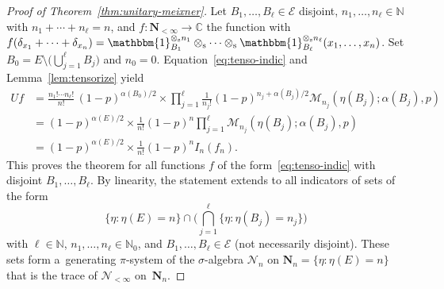 \documentclass[10pt,a4paper]{amsart}
\numberwithin{equation}{section}
\newcommand{\N}{\mathbb{N}}
\newcommand{\C}{\mathbb{C}}
\newcommand{\1}{\mathbbm{1}}
\begin{document}
\begin{proof}[Proof of Theorem~\ref{thm:unitary-meixner}]
	Let $B_1,\ldots, B_\ell \in \mathcal E$ disjoint, $n_1,\ldots,n_\ell \in \N$ with $n_1+\cdots + n_\ell=n$, and $f\colon \mathbf N_{<\infty}\to \C$ the function with $f(\delta_{x_1}+\cdots + \delta_{x_n}) = \1_{B_1}^{\otimes_\mathrm s n_1}\otimes_{\mathrm s} \cdots \otimes_{\mathrm s} \1_{B_\ell}^{\otimes_\mathrm s n_\ell}(x_1,\ldots,x_n)$. Set $B_0 = E\setminus \bigl(\bigcup_{j=1}^\ell B_j\bigr)$ and $n_0=0$. Equation~\eqref{eq:tenso-indic} and Lemma~\ref{lem:tensorize} yield
	\begin{align*}
		U f &{}= \frac{n_1!\cdots n_\ell!}{n!}\, (1-p)^{\alpha(B_0)/2} \times \prod_{j=1}^\ell \frac{1}{n_j!} (1-p)^{n_j+\alpha(B_j)/2}\mathcal M_{n_j}( \eta(B_j);\alpha(B_j),p) \\
				&{}= (1-p)^{\alpha(E)/2} \times \frac{1}{n!}(1-p)^n \prod_{j=1}^\ell \mathcal M_{n_j}( \eta(B_j);\alpha(B_j),p) \\
				&{}= (1-p)^{\alpha(E)/2} \times \frac{1}{n!}(1-p)^n I_n(f_n).
	\end{align*}
	This proves the theorem for all functions $f$ of the form~\eqref{eq:tenso-indic} with disjoint $B_1,\ldots, B_\ell$. By linearity, the statement extends to all indicators of sets of the form
	\[
		\{\eta\colon \eta(E) = n\}\cap \Biggl( \bigcap_{j=1}^\ell \{\eta\colon \eta(B_j) = n_j\}\Biggr)
	\]
	with $\ell \in \N$, $n_1,\ldots,n_\ell\in \N_0$, and $B_1,\ldots, B_\ell \in \mathcal E$ (not necessarily disjoint). These sets form a~generating $\pi$-system of the $\sigma$-algebra $\mathcal N_n$ on $\mathbf N_n =\{\eta\colon\eta(E) =n\}$ that is the trace of $\mathcal N_{<\infty}$ on~$\mathbf N_n$.
	

\end{proof}
\end{document}
